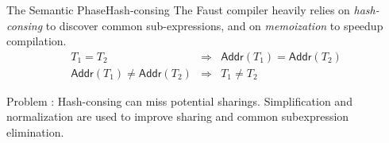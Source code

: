 


\begin{frame}{The Semantic Phase}{Hash-consing}
The Faust compiler heavily relies on \emph{hash-consing} to discover common sub-expressions, and on \emph{memoization} to speedup compilation. 
\begin{eqnarray*}
T_1=T_2 &\Rightarrow& \mathsf{Addr}(T_1)=\mathsf{Addr}(T_2)\\
\mathsf{Addr}(T_1)\neq\mathsf{Addr}(T_2) &\Rightarrow& T_1\neq T_2 
\end{eqnarray*}

Problem : Hash-consing can miss potential sharings. Simplification and normalization are used to improve sharing and common subexpression elimination.

\end{frame}



